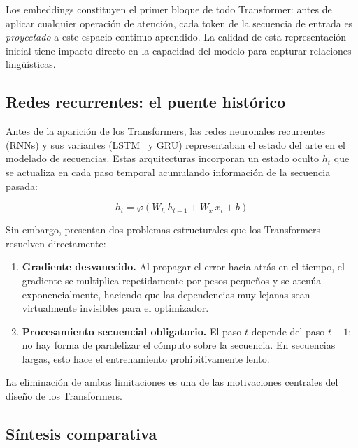

Los embeddings constituyen el primer bloque de todo Transformer: antes de
aplicar cualquier operación de atención, cada token de la secuencia de entrada
es \textit{proyectado} a este espacio continuo aprendido. La calidad de esta
representación inicial tiene impacto directo en la capacidad del modelo para
capturar relaciones lingüísticas.

\subsection{Redes recurrentes: el puente histórico}
\label{subsec:rnn}

Antes de la aparición de los Transformers, las redes neuronales recurrentes
(RNNs) y sus variantes (LSTM~\cite{hochreiter1997lstm} y GRU) representaban
el estado del arte en el modelado de secuencias. Estas arquitecturas
incorporan un estado oculto $h_t$ que se actualiza en cada paso temporal
acumulando información de la secuencia pasada:

\begin{equation}
    h_t = \varphi(W_h \, h_{t-1} + W_x \, x_t + b)
\end{equation}

Sin embargo, presentan dos problemas estructurales que los Transformers
resuelven directamente:

\begin{enumerate}
    \item \textbf{Gradiente desvanecido.} Al propagar el error hacia atrás
    en el tiempo, el gradiente se multiplica repetidamente por pesos pequeños
    y se atenúa exponencialmente, haciendo que las dependencias muy lejanas
    sean virtualmente invisibles para el optimizador.

    \item \textbf{Procesamiento secuencial obligatorio.} El paso $t$ depende
    del paso $t{-}1$: no hay forma de paralelizar el cómputo sobre la
    secuencia. En secuencias largas, esto hace el entrenamiento prohibitivamente
    lento.
\end{enumerate}

La eliminación de ambas limitaciones es una de las motivaciones centrales
del diseño de los Transformers.

\subsection{Síntesis comparativa}
\label{subsec:comparacion}

